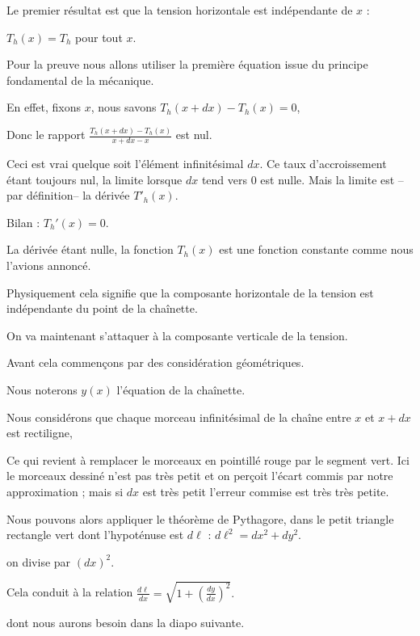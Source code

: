 Le premier résultat est que la tension horizontale est indépendante de $x$ :

$T_h(x) = T_h $ pour tout $x$.

\change
Pour la preuve nous allons utiliser la première équation 
issue du principe fondamental de la mécanique.

\change
En effet, fixons $x$, nous savons $T_h(x+dx)-T_h(x)=0$,

\change
Donc le rapport $\frac{T_h(x+dx)-T_h(x)}{x+dx-x}$
est nul.

\change
Ceci est vrai quelque soit l'élément infinitésimal $dx$. 
Ce taux d'accroissement étant toujours nul, 
la limite lorsque $dx$ tend vers $0$ est nulle.
Mais la limite est --par définition-- la dérivée $T'_h(x)$.

\change
Bilan : $T_h'(x)=0$. 

\change
La dérivée étant nulle, la fonction $T_h(x)$ est une fonction constante
comme nous l'avions annoncé.

Physiquement cela signifie que la composante horizontale de la tension est 
indépendante du point de la chaînette.

\diapo


On va maintenant s'attaquer à la composante verticale de la tension.

Avant cela commençons par des considération géométriques.

Nous noterons $y(x)$ l'équation de la chaînette.

\change
Nous considérons que chaque morceau infinitésimal de la chaîne 
entre $x$ et $x+dx$ est rectiligne, 

Ce qui revient à remplacer le morceaux en pointillé rouge par le segment vert.
Ici le morceaux dessiné n'est pas très petit et on perçoit l'écart commis 
par notre approximation ; mais si $dx$ est très petit l'erreur commise est très très petite.


\change
Nous pouvons
alors appliquer le théorème de Pythagore, 
dans le petit triangle rectangle vert dont l'hypoténuse est $d\ell$ :
$d \ell^2 = dx^2 + dy^2.$

\change
on divise par $(dx)^2$.

\change
Cela conduit à la relation
$\frac{d\ell}{dx}=\sqrt{1+ \left(\frac{dy}{dx}\right)^2}.$

dont nous aurons besoin dans la diapo suivante.


\diapo

